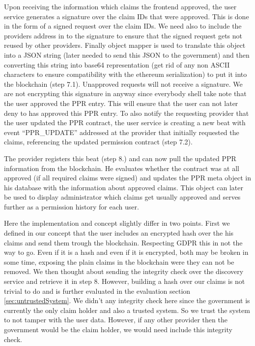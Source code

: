 Upon receiving the information which claims the frontend approved, the user service generates a signature over the claim IDs that were approved. This is done in the form of a signed request over the claim IDs. We need also to include the providers address in to the signature to ensure that the signed request gets not reused by other providers. Finally object mapper is used to translate this object into a JSON string (later needed to send this JSON to the government) and then converting this string into base64 representation (get rid of any non ASCII characters to ensure compatibility with the ethereum serialization) to put it into the blockchain (step 7.1). Unapproved requests will not receive a signature. We are not encrypting this signature in anyway since everybody shell take note that the user approved the PPR entry. This will ensure that the user can not later deny to has approved this PPR entry. To also notify the requesting provider that the user updated the PPR contract, the user service is creating a new beat with event “PPR\_UPDATE” addressed at the provider that initially requested the claims, referencing the updated permission contract (step 7.2). 

The provider registers this beat (step 8.) and can now pull the updated PPR information from the blockchain. He evaluates whether the contract was at all approved (if all required claims were signed) and updates the PPR meta object in his database with the information about approved claims. This object can later be used to display administrator which claims get usually approved and serves further as a permission history for each user. 

Here the implementation and concept slightly differ in two points. First we defined in our concept that the user includes an encrypted hash over the his claims and send them trough the blockchain. Respecting GDPR this in not the way to go. Even if it is a hash and even if it is encrypted, both may be broken in some time, exposing the plain claims in the blockchain were they can not be removed. We then thought about sending the integrity check over the discovery service and retrieve it in step 8. However, building a hash over our claims is not trivial to do and is further evaluated in the evaluation section \ref{sec:untrustedSystem}. We didn’t any integrity check here since the government is currently the only claim holder and also a trusted system. So we trust the system to not tamper with the user data. However, if any other provider then the government would be the claim holder, we would need include this integrity check. 

